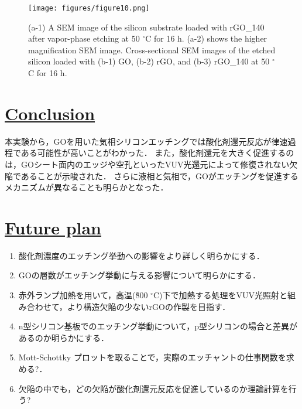 \documentclass[platex,dvipdfmx]{jlreq}			%
\begin{document}
\begin{figure}[H]
    \centering
    \texttt{[image: figures/figure10.png]}
    \caption{(a-1) A SEM image of the silicon substrate loaded with rGO\_140 after vapor-phase etching at 50 ${}^\circ$C for 16 h. (a-2) shows the higher magnification SEM image. Cross-sectional SEM images of the etched silicon loaded with (b-1) GO, (b-2) rGO, and (b-3) rGO\_140 at 50 ${}^\circ$C for 16 h.}
    \label{fig:SEM}
\end{figure}

\section*{\ul{Conclusion}}
本実験から，GOを用いた気相シリコンエッチングでは酸化剤還元反応が律速過程である可能性が高いことがわかった．
また，酸化剤還元を大きく促進するのは，GOシート面内のエッジや空孔といったVUV光還元によって修復されない欠陥であることが示唆された．
さらに液相と気相で，GOがエッチングを促進するメカニズムが異なることも明らかとなった．

\section*{\ul{Future plan}}
\begin{enumerate}
    \item 酸化剤濃度のエッチング挙動への影響をより詳しく明らかにする．
    \item GOの層数がエッチング挙動に与える影響について明らかにする．
    \item 赤外ランプ加熱を用いて，高温(\~ 800 ${}^\circ$C)下で加熱する処理をVUV光照射と組み合わせて，より構造欠陥の少ないrGOの作製を目指す．
    \item n型シリコン基板でのエッチング挙動について，p型シリコンの場合と差異があるのか明らかにする．
    \item Mott-Schottky プロットを取ることで，実際のエッチャントの仕事関数を求める?．
    \item 欠陥の中でも，どの欠陥が酸化剤還元反応を促進しているのか理論計算を行う?
\end{enumerate}
\end{document}
